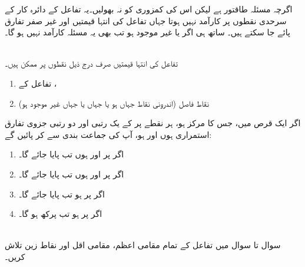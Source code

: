  اگرچہ مسئلہ    طاقتور  ہے لیکن  اس کی کمزوری کو  نہ بھولیں۔یہ تفاعل کے دائرہ کار کے سرحدی نقطوں پر کارآمد نہیں ہوتا  جہاں تفاعل کی  انتہا قیمتیں اور غیر صفر تفارق پائے جا  سکتے   ہیں۔  ساتھ ہی  اگر  یا  غیر موجود ہو تب بھی یہ مسئلہ کارآمد نہیں ہو گا۔
 
\\
تفاعل  کی انتہا قیمتیں صرف درج ذیل نقطوں پر ممکن ہیں۔
\begin{enumerate}[1.]
\item
تفاعل  کے ،
\item
نقاط فاصل (اندرونی نقاط جہاں  ہو یا  جہاں    یا جہاں    غیر موجود ہو) 
\end{enumerate}
اگر ایک قرص  میں، جس کا مرکز  ہو، ہر نقطے پر   کے یک رتبی اور دو رتبی جزوی تفارق استمراری ہوں اور  ہو، آپ   کی  جماعت بندی  سے کر پائیں گے:
\begin{enumerate}[1.]
\item
اگر  پر  اور  ہوں تب پایا جائے گا۔
\item
اگر  پر  اور  ہوں تب  پایا جائے گا۔
\item
اگر  پر  ہو تب   پایا جائے گا۔
\item
اگر  پر  ہو  تب پرکھ   ہو گا۔
\end{enumerate}


\\
سوال  تا سوال   میں تفاعل کے  تمام مقامی اعظم، مقامی اقل اور نقاط زین تلاش کریں۔

